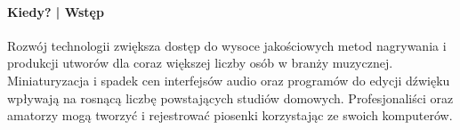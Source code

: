 \documentclass[12pt]{article}
\begin{document}





\paragraph{Kiedy? | Wstęp}

Rozwój technologii zwiększa dostęp do wysoce jakościowych metod nagrywania i produkcji utworów dla coraz większej liczby osób w branży muzycznej.
Miniaturyzacja i spadek cen interfejsów audio oraz programów do edycji dźwięku wpływają na rosnącą liczbę powstających studiów domowych.
Profesjonaliści oraz amatorzy mogą tworzyć i rejestrować piosenki korzystając ze swoich komputerów.
\end{document}
